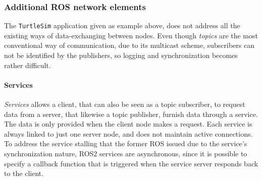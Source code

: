 
\subsubsection{Additional ROS network elements}

The \texttt{TurtleSim} application given as example above, %
does not address all the existing ways of data-exchanging between nodes. Even though \textit{topics} are the most conventional way of communication, due to its multicast scheme, subscribers can not be identified by the publishers, so logging and synchronization becomes rather difficult.

\paragraph{Services}

\textit{Services} allows a client, that can also be seen as a topic subscriber, to request data from a server, that likewise a topic publisher, furnish data through a service. The data is only provided when the client node makes a request. Each service is always linked to just one server node, and does not maintain active connections. To address the service stalling that the former ROS issued due to the service's synchronization nature, ROS2 services are asynchronous, since it is possible to specify a callback function that is triggered when the service server responds back to the client.
                          

